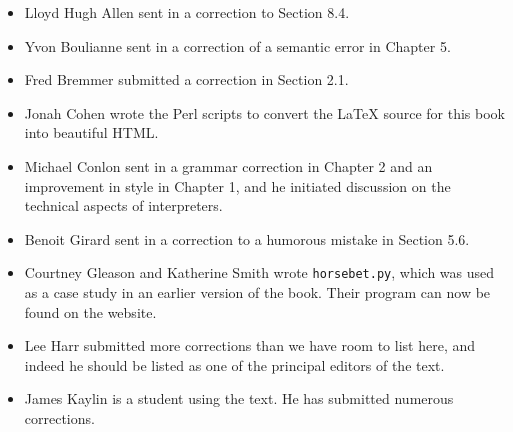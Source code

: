 \documentclass[10pt]{book}
\begin{document}
\small

\begin{itemize}

\item Lloyd Hugh Allen sent in a correction to Section 8.4.

\item Yvon Boulianne sent in a correction of a semantic error in
Chapter 5.

\item Fred Bremmer submitted a correction in Section 2.1.

\item Jonah Cohen wrote the Perl scripts to convert the
LaTeX source for this book into beautiful HTML.


\item Michael Conlon sent in a grammar correction in Chapter 2
and an improvement in style in Chapter 1, and he initiated discussion
on the technical aspects of interpreters.


\item Benoit Girard sent in a
correction to a humorous mistake in Section 5.6.


\item Courtney Gleason and Katherine Smith wrote {\tt horsebet.py},
which was used as a case study in an earlier version of the book.  Their
program can now be found on the website.


\item Lee Harr submitted more corrections than we have room to list
here, and indeed he should be listed as one of the principal editors
of the text.


\item James Kaylin is a student using the text. He has submitted
numerous corrections.



\end{itemize}
\end{document}
